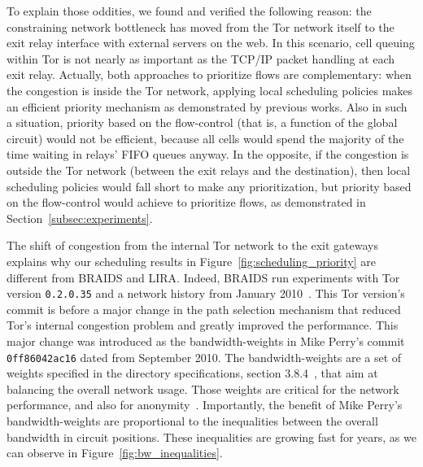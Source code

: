 To explain those oddities, we found and verified the following reason: the 
constraining network bottleneck has moved from the
Tor network itself to the exit relay interface with external servers on the
web. In this scenario, cell queuing within Tor is not nearly as important as the
TCP/IP packet handling at each exit relay. Actually, both approaches to prioritize 
flows are complementary: when the congestion is inside the Tor network, applying 
local scheduling policies makes an efficient priority mechanism as demonstrated by previous works. Also in such a situation, priority 
based on the flow-control (that is, a function of the global circuit) would not be 
efficient, because all cells would spend the majority of the time waiting in 
relays' FIFO queues anyway. In the opposite, if the congestion is outside the Tor 
network (between the exit relays and the destination), then local scheduling 
policies would fall short to make any prioritization, but priority based on the 
flow-control would achieve to prioritize flows, as demonstrated in Section~\ref{subsec:experiments}. 

The shift of congestion from the internal Tor network to the exit gateways explains why our scheduling results in Figure~\ref{fig:scheduling_priority} are different from BRAIDS
and LIRA. Indeed, BRAIDS run experiments with Tor version \texttt{0.2.0.35} and a network history
from January 2010~\cite{braids-repository}. This Tor version's commit is
before a major change in the path selection mechanism that reduced Tor's
internal congestion problem and greatly improved the performance. This major change
was introduced as the bandwidth-weights in Mike Perry's commit \texttt{0ff86042ac16}
dated from September 2010. The bandwidth-weights are a set of weights specified
in the directory specifications, section 3.8.4~\cite{dirspec}, that aim at
balancing the overall network usage. Those weights are
critical for the network performance, and also for
anonymity~\cite{waterfilling-pets2017, wf_proposal}. Importantly, the benefit
of Mike Perry's bandwidth-weights are proportional to the inequalities between
the overall bandwidth in circuit positions. These inequalities are growing fast for years, as we can observe in Figure~\ref{fig:bw_inequalities}.


